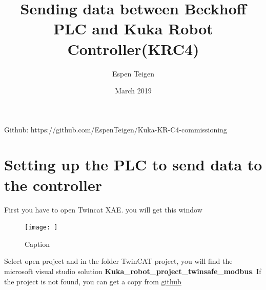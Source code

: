 \documentclass{article}
\title{Sending data between Beckhoff PLC and Kuka Robot Controller(KRC4)}
\author{Espen Teigen }
\date{March 2019}
\begin{document}
\maketitle

    Github: https://github.com/EspenTeigen/Kuka-KR-C4-commissioning

\newpage
\section{Setting up the PLC to send data to the controller}
First you have to open Twincat XAE. you will get this window

\begin{figure}
    \centering
    \texttt{[image: ]}
    \caption{Caption}
    \label{fig:my_label}
\end{figure}

Select open project and in the folder TwinCAT project, you will find the microsoft visual studio solution \textbf{Kuka\_robot\_project\_twinsafe\_modbus}. If the project is not found, you can get a copy from \href{https://github.com/EspenTeigen/Kuka-KR-C4-commissioning}{\underline{github}}
\end{document}
